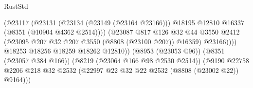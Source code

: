 \begin{lexlean}{RustStd}
\begin{coremodule}
                                                      (@23117
                                                        (@23131
                                                          (@23134 (@23149 (@23164 @23166)))
                                                          @18195
                                                          @12810
                                                          @16337
                                                          (@8351 (@10904 @4362 @2514))))
                                                      (@23087
                                                        @817
                                                        @126
                                                        @32
                                                        @44
                                                        @3550
                                                        @2412
                                                        (@23095
                                                          @207
                                                          @32
                                                          @207
                                                          @3550
                                                          (@8808 (@23100 @207))
                                                          @16359)
                                                        @23166))))
                                                @18253
                                                @18256
                                                @18259
                                                @18262
                                                @12810))
                                            (@8953 (@23053 @96))
                                            (@8351 (@23057 @384 @166))
                                            (@8219 (@23064 @166 @98 @2530 @2514))
                                            (@9190
                                              @22758
                                              @2206
                                              @218
                                              @32
                                              @2532
                                              (@22997
                                                @22
                                                @32
                                                @22
                                                @2532
                                                (@8808 (@23002 @22))
                                                @9164)))

\end{coremodule}
\end{lexlean}
